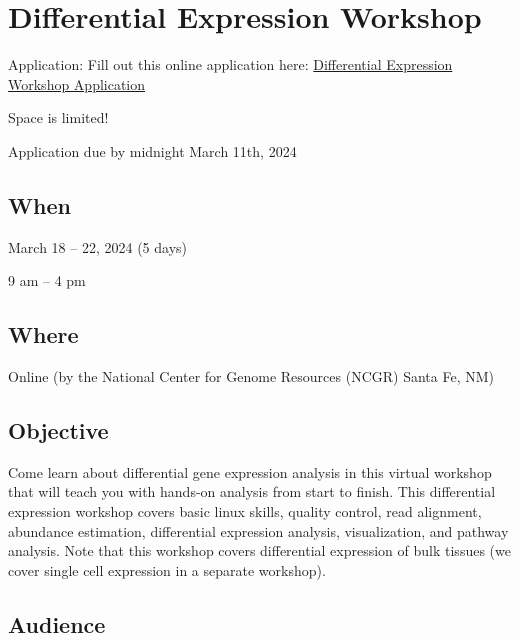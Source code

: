 \documentclass[
]{book}
\begin{document}
\hypertarget{differential-expression-workshop}{%
\chapter*{Differential Expression Workshop}\label{differential-expression-workshop}}

Application: Fill out this online application here:
\href{https://docs.google.com/forms/d/e/1FAIpQLScpoKxE0yAnCK3yOl5hBde7MtOWCOeXYxvjBfWyDcA9hHDGrw/viewform}{Differential Expression Workshop Application}

Space is limited!

Application due by midnight March 11th, 2024

\hypertarget{when-4}{%
\section*{When}\label{when-4}}

March 18 -- 22, 2024 (5 days)

9 am -- 4 pm

\hypertarget{where-3}{%
\section*{Where}\label{where-3}}

Online (by the National Center for Genome Resources (NCGR) Santa Fe, NM)

\hypertarget{objective-3}{%
\section*{Objective}\label{objective-3}}

Come learn about differential gene expression analysis in this virtual workshop that will teach you with hands-on analysis from start to finish. This differential expression workshop covers basic linux skills, quality control, read alignment, abundance estimation, differential expression analysis, visualization, and pathway analysis. Note that this workshop covers differential expression of bulk tissues (we cover single cell expression in a separate workshop).

\hypertarget{audience-3}{%
\section*{Audience}\label{audience-3}}
\end{document}
